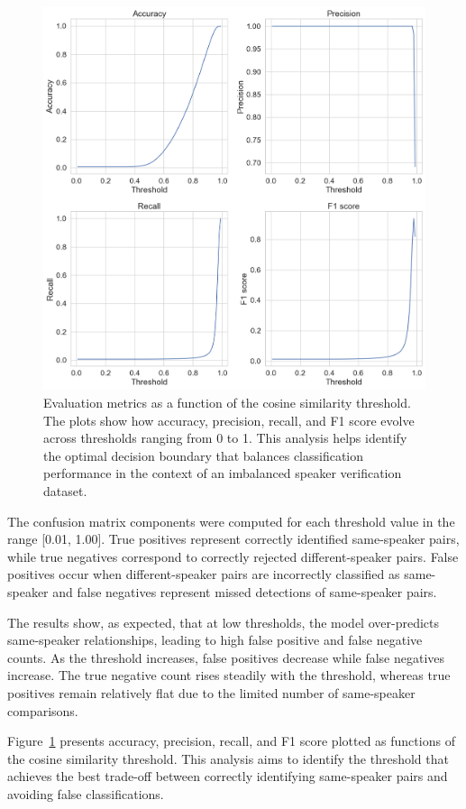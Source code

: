 \documentclass[conference]{IEEEtran}
\begin{document}
\begin{figure}[H]
	\centering
	\includegraphics[width=0.9\linewidth]{img/img-metrics}
	\caption{Evaluation metrics as a function of the cosine similarity threshold. The plots show how accuracy, precision, recall, and F1 score evolve across thresholds ranging from 0 to 1. This analysis helps identify the optimal decision boundary that balances classification performance in the context of an imbalanced speaker verification dataset.}
	\label{fig:img-metrics}
\end{figure}

The confusion matrix components were computed for each threshold value in the range [0.01, 1.00]. True positives represent correctly identified same-speaker pairs, while true negatives correspond to correctly rejected different-speaker pairs. False positives occur when different-speaker pairs are incorrectly classified as same-speaker and false negatives represent missed detections of same-speaker pairs.

The results show, as expected, that at low thresholds, the model over-predicts same-speaker relationships, leading to high false positive and false negative counts. As the threshold increases, false positives decrease while false negatives increase. The true negative count rises steadily with the threshold, whereas true positives remain relatively flat due to the limited number of same-speaker comparisons.

Figure~\ref{fig:img-metrics} presents accuracy, precision, recall, and F1 score plotted as functions of the cosine similarity threshold. This analysis aims to identify the threshold that achieves the best trade-off between correctly identifying same-speaker pairs and avoiding false classifications.
\end{document}
